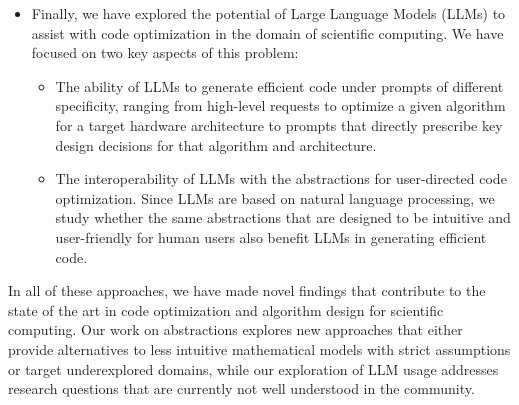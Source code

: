 \begin{itemize}
\begin{itemize}
    Cellato explores a domain that is at this point not well supported by existing tools and frameworks. While there are many tools (including abstractions) for stencil computations, they do not offer flexibility in data layouts specific to discrete stencils, such as bit-level encodings~.
  \end{itemize}
  \item Finally, we have explored the potential of Large Language Models (LLMs) to assist with code optimization in the domain of scientific computing. We have focused on two key aspects of this problem:
  \begin{itemize}
    \item The ability of LLMs to generate efficient code under prompts of different specificity, ranging from high-level requests to optimize a given algorithm for a target hardware architecture to prompts that directly prescribe key design decisions for that algorithm and architecture.
    \item The interoperability of LLMs with the abstractions for user-directed code optimization. Since LLMs are based on natural language processing, we study whether the same abstractions that are designed to be intuitive and user-friendly for human users also benefit LLMs in generating efficient code.
  \end{itemize}
\end{itemize}

In all of these approaches, we have made novel findings that contribute to the state of the art in code optimization and algorithm design for scientific computing. Our work on abstractions explores new approaches that either provide alternatives to less intuitive mathematical models with strict assumptions or target underexplored domains, while our exploration of LLM usage addresses research questions that are currently not well understood in the community.
